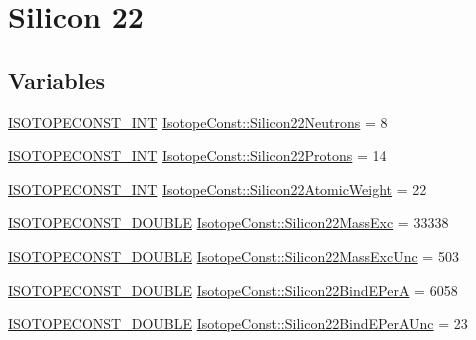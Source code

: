 \hypertarget{group___isotope_const-_silicon-_si22}{}\section{Silicon 22}
\label{group___isotope_const-_silicon-_si22}
\subsection*{Variables}
\begin{DoxyCompactItemize}
\item 
\mbox{\hyperlink{group___isotope_const-_macros_ga5f18360b3e99483a35c32d789e62621c}{I\+S\+O\+T\+O\+P\+E\+C\+O\+N\+S\+T\+\_\+\+I\+NT}} \mbox{\hyperlink{group___isotope_const-_silicon-_si22_gaa5f3ca4a5874748d75676cd6104314e5}{Isotope\+Const\+::\+Silicon22\+Neutrons}} = 8
\item 
\mbox{\hyperlink{group___isotope_const-_macros_ga5f18360b3e99483a35c32d789e62621c}{I\+S\+O\+T\+O\+P\+E\+C\+O\+N\+S\+T\+\_\+\+I\+NT}} \mbox{\hyperlink{group___isotope_const-_silicon-_si22_ga73e20cfcc292aad3abb22333371de7c1}{Isotope\+Const\+::\+Silicon22\+Protons}} = 14
\item 
\mbox{\hyperlink{group___isotope_const-_macros_ga5f18360b3e99483a35c32d789e62621c}{I\+S\+O\+T\+O\+P\+E\+C\+O\+N\+S\+T\+\_\+\+I\+NT}} \mbox{\hyperlink{group___isotope_const-_silicon-_si22_ga3366592ffab44871f9200a1e8b44d1ab}{Isotope\+Const\+::\+Silicon22\+Atomic\+Weight}} = 22
\item 
\mbox{\hyperlink{group___isotope_const-_macros_ga8f45a7272ce02c0b4c65c44636ed719a}{I\+S\+O\+T\+O\+P\+E\+C\+O\+N\+S\+T\+\_\+\+D\+O\+U\+B\+LE}} \mbox{\hyperlink{group___isotope_const-_silicon-_si22_ga5eb8937f91feec5c7376106b06a59e9b}{Isotope\+Const\+::\+Silicon22\+Mass\+Exc}} = 33338
\item 
\mbox{\hyperlink{group___isotope_const-_macros_ga8f45a7272ce02c0b4c65c44636ed719a}{I\+S\+O\+T\+O\+P\+E\+C\+O\+N\+S\+T\+\_\+\+D\+O\+U\+B\+LE}} \mbox{\hyperlink{group___isotope_const-_silicon-_si22_gaa7374a35761c33df503bb9edab10ab54}{Isotope\+Const\+::\+Silicon22\+Mass\+Exc\+Unc}} = 503
\item 
\mbox{\hyperlink{group___isotope_const-_macros_ga8f45a7272ce02c0b4c65c44636ed719a}{I\+S\+O\+T\+O\+P\+E\+C\+O\+N\+S\+T\+\_\+\+D\+O\+U\+B\+LE}} \mbox{\hyperlink{group___isotope_const-_silicon-_si22_ga61ec11eebba4bf9b1d8ddc02a9b3c516}{Isotope\+Const\+::\+Silicon22\+Bind\+E\+PerA}} = 6058
\item 
\mbox{\hyperlink{group___isotope_const-_macros_ga8f45a7272ce02c0b4c65c44636ed719a}{I\+S\+O\+T\+O\+P\+E\+C\+O\+N\+S\+T\+\_\+\+D\+O\+U\+B\+LE}} \mbox{\hyperlink{group___isotope_const-_silicon-_si22_ga89d34443002e1be22e5ef174ac0322c5}{Isotope\+Const\+::\+Silicon22\+Bind\+E\+Per\+A\+Unc}} = 23

\end{DoxyCompactItemize}
